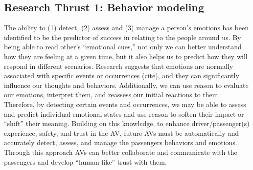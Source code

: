 \subsection{Research Thrust 1: Behavior modeling}
\label{sec:behaviour}

 The ability to (1) detect, (2) assess and (3) manage a person’s emotions has been identified to be the predictor of success in relating to the people around us. By being able to read other’s “emotional cues,” not only we can better understand how they are feeling at a given time, but it also helps us to predict how they will respond in different scenarios. Research suggests that emotions are normally associated with specific events or occurrences (cite), and they can significantly influence our thoughts and behaviors. Additionally, we can use reason to evaluate our emotions, interpret them, and reassess our initial reactions to them. Therefore, by detecting certain events and occurrences, we may be able to assess and predict individual emotional states and use reason to soften their impact or “shift” their meaning. Building on this knowledge, to enhance driver/passenger(s) experience, safety, and trust in the AV, future AVs must be automatically and accurately detect, assess, and manage the passengers behaviors and emotions. Through this approach AVs can better collaborate and communicate with the passengers and develop “human-like” trust with them. 
 
